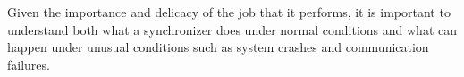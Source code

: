 \documentclass{article}
\begin{document}

Given the importance and delicacy of the job that it performs, it is
important to understand both what a synchronizer does under normal
conditions and what can happen under unusual conditions such as system
crashes and communication failures.




\end{document}
